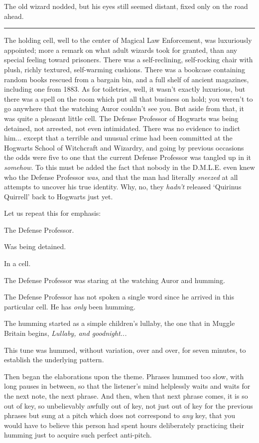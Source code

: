 The old wizard nodded, but his eyes still seemed distant, fixed only on the road ahead.

\begin{center}\rule{3in}{0.4pt}\end{center}

The holding cell, well to the center of Magical Law Enforcement, was luxuriously appointed; more a remark on what adult wizards took for granted, than any special feeling toward prisoners. There was a self-reclining, self-rocking chair with plush, richly textured, self-warming cushions. There was a bookcase containing random books rescued from a bargain bin, and a full shelf of ancient magazines, including one from 1883. As for toiletries, well, it wasn't exactly luxurious, but there was a spell on the room which put all that business on hold; you weren't to go anywhere that the watching Auror couldn't see you. But aside from that, it was quite a pleasant little cell. The Defense Professor of Hogwarts was being detained, not arrested, not even intimidated. There was no evidence to indict him... except that a terrible and unusual crime had been committed at the Hogwarts School of Witchcraft and Wizardry, and going by previous occasions the odds were five to one that the current Defense Professor was tangled up in it \emph{somehow}. To this must be added the fact that nobody in the D.M.L.E. even knew who the Defense Professor \emph{was}, and that the man had literally \emph{sneezed} at all attempts to uncover his true identity. Why, no, they \emph{hadn't} released `Quirinus Quirrell' back to Hogwarts just yet.

Let us repeat this for emphasis:

The Defense Professor.

Was being detained.

In a cell.

The Defense Professor was staring at the watching Auror and humming.

The Defense Professor has not spoken a single word since he arrived in this particular cell. He has \emph{only} been humming.

The humming started as a simple children's lullaby, the one that in Muggle Britain begins, \emph{Lullaby, and goodnight...}

This tune was hummed, without variation, over and over, for seven minutes, to establish the underlying pattern.

Then began the elaborations upon the theme. Phrases hummed too slow, with long pauses in between, so that the listener's mind helplessly waits and waits for the next note, the next phrase. And then, when that next phrase comes, it is so out of key, so unbelievably awfully out of key, not just out of key for the previous phrases but sung at a pitch which does not correspond to \emph{any} key, that you would have to believe this person had spent hours deliberately practicing their humming just to acquire such perfect anti-pitch.

